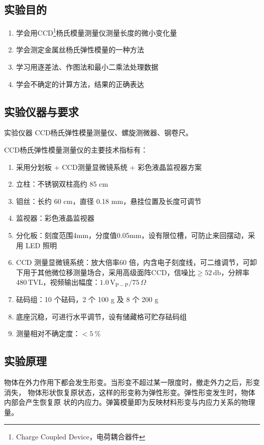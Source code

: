 \documentclass[zihao=5, UTF8]{article}
\theoremstyle{MyLineTheoremStyle} %
\theoremstyle{MyBlockTheoremStyle} %
\theoremstyle{MySubsubsectionStyle} %
\begin{document}
\subsection{实验目的}


\begin{enumerate}
    \item 学会用CCD\footnote{Charge Coupled Device，电荷耦合器件}杨氏模量测量仪测量长度的微小变化量
    \item 学会测定金属丝杨氏弹性模量的一种方法
    \item 学习用逐差法、作图法和最小二乘法处理数据
    \item 学会不确定的计算方法，结果的正确表达
\end{enumerate}

\subsection{实验仪器与要求}
实验仪器 CCD杨氏弹性模量测量仪、螺旋测微器、钢卷尺。

CCD杨氏弹性模量测量仪的主要技术指标有：


\begin{enumerate}[leftmargin=2cm]
    \item 采用分划板 + CCD测量显微镜系统 + 彩色液晶监视器方案
    \item 立柱：不锈钢双柱高约 85 cm
    \item 钼丝：长约 60 cm，直径 0.18 mm，悬挂位置及长度可调节
    \item 监视器：彩色液晶监视器
    \item 分化板：刻度范围4mm，分度值0.05mm，设有限位槽，可防止来回摆动，采用 LED 照明
    \item CCD 测量显微镜系统：放大倍率60 倍，内含电子刻度线，可二维调节，可卸下用于其他微位移测量场合，采用高级面阵CCD，信噪比$ \geqslant 52\,\mathrm{db} $，分辨率$ 480\,\mathrm{TVL} $，视频输出幅度：$ 1.0\,\mathrm{V_{P-P}}/75\,\Omega $
    \item  砝码组：10 个砝码，2 个 100 g 及 8 个 200 g
    \item 底座沉稳，可进行水平调节，设有储藏格可贮存砝码组
    \item 测量相对不确定度：$< 5\ \%$
\end{enumerate}


\subsection{实验原理}
物体在外力作用下都会发生形变。当形变不超过某一限度时，撤走外力之后，形变消失，
物体形状恢复原状态，这样的形变称为弹性形变。弹性形变发生时，物体内部会产生恢复原
状的内应力。弹簧模量即为反映材料形变与内应力关系的物理量。
\end{document}
